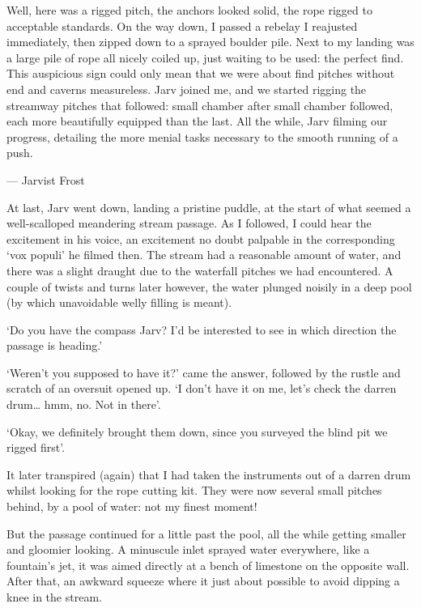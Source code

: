 Well, here was a rigged pitch, the anchors looked solid, the rope rigged to acceptable standards. On the way down, I passed a rebelay I reajusted immediately, then zipped down to a sprayed boulder pile. Next to my landing was a large pile of rope all nicely coiled up, just waiting to be used: the perfect find. This auspicious sign could only mean that we were about find pitches without end and caverns measureless. Jarv joined me, and we started rigging the streamway pitches that followed: small chamber after small chamber followed, each more beautifully equipped than the last. All the while, Jarv filming our progress, detailing the more menial tasks necessary to the smooth running of  a push.

\begin{marginfigure}
\centering
{}
\label{tanguybolting}
\caption{--- Jarvist Frost}
\end{marginfigure}

At last, Jarv went down, landing a pristine puddle, at the start of what seemed a well-scalloped meandering stream passage. As I followed, I could hear the excitement in his voice, an excitement no doubt palpable in the corresponding ‘vox populi’ he filmed then. The stream had a reasonable amount of water, and there was a slight draught due to the waterfall pitches we had encountered. A couple of twists and turns later however, the water plunged noisily in a deep pool (by which unavoidable welly filling is meant). 

‘Do you have the compass Jarv? I’d be interested to see in which direction the passage is heading.’

‘Weren’t you supposed to have it?’ came the answer, followed by the rustle and scratch of an oversuit opened up. ‘I don’t have it on me, let’s check the darren drum… hmm, no. Not in there’.

‘Okay, we definitely brought them down, since you surveyed the blind pit we rigged first’.

It later transpired (again) that I had taken the instruments out of a darren drum whilst looking for the rope cutting kit.  They were now several small pitches behind, by a pool of water: not my finest moment! 

But the passage continued for a little past the pool, all the while getting smaller and gloomier looking. A minuscule inlet sprayed water everywhere, like a fountain’s jet, it was aimed directly at a bench of limestone on the opposite wall. After that, an awkward squeeze where it just about possible to avoid dipping a knee in the stream. 

